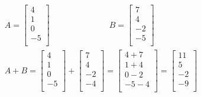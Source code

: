 \begin{eks}
\begin{align*}
A=
\begin{bmatrix}
4\\
1\\
0\\
-5\\
\end{bmatrix}
\hspace{3cm}
B=
\begin{bmatrix}
7\\
4\\
-2\\
-5\\
\end{bmatrix}\\
A+B=
\begin{bmatrix}
4\\
1\\
0\\
-5\\
\end{bmatrix}
+
\begin{bmatrix}
7\\
4\\
-2\\
-4\\
\end{bmatrix}
=
\begin{bmatrix}
4+7\\
1+4\\
0-2\\
-5-4\\
\end{bmatrix}
=
\begin{bmatrix}
11\\
5\\
-2\\
-9\\
\end{bmatrix}
\end{align*}
\end{eks}

